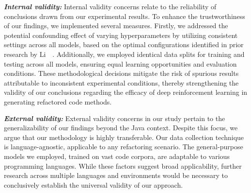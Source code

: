 \noindent

\textit{\textbf{Internal validity:}} Internal validity concerns relate to the reliability of conclusions drawn from our experimental results. To enhance the trustworthiness of our findings, we implemented several measures. Firstly, we addressed the potential confounding effect of varying hyperparameters by utilizing consistent settings across all models, based on the optimal configurations identified in prior research by Li~\etal{}~\cite{li2024ircoco}. Additionally, we employed identical data splits for training and testing across all models, ensuring equal learning opportunities and evaluation conditions. These methodological decisions mitigate the risk of spurious results attributable to inconsistent experimental conditions, thereby strengthening the validity of our conclusions regarding the efficacy of deep reinforcement learning in generating refactored code methods.


\textit{\textbf{External validity:}} External validity concerns in our study pertain to the generalizability of our findings beyond the Java context. Despite this focus, we argue that our methodology is highly transferable. Our data collection technique is language-agnostic, applicable to any refactoring scenario. The general-purpose models we employed, trained on vast code corpora, are adaptable to various programming languages. While these factors suggest broad applicability, further research across multiple languages and environments would be necessary to conclusively establish the universal validity of our approach.

